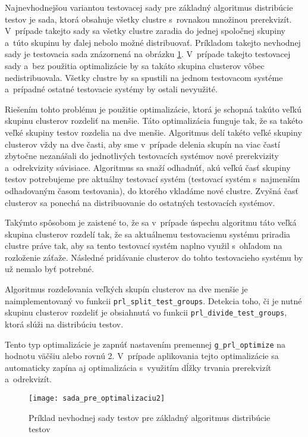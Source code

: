 Najnevhodnejšou variantou testovacej sady pre základný algoritmus 
distribúcie testov je sada, ktorá obsahuje všetky clustre s~rovnakou 
množinou prerekvizít. V~prípade takejto sady sa všetky clustre zaradia 
do jednej spoločnej skupiny a~túto skupinu by ďalej nebolo možné 
distribuovať. Príkladom takejto nevhodnej sady je testovacia sada 
znázornená na obrázku \ref{obrazok:sada_pre_optimalizaciu2}.
V~prípade takejto testovacej sady a~bez použitia optimalizácie by 
sa takáto skupina clusterov vôbec nedistribuovala. Všetky clustre by sa 
spustili na jednom testovacom systéme a~prípadné ostatné testovacie 
systémy by ostali nevyužité.

Riešením tohto problému je použitie optimalizácie, ktorá je schopná 
takúto veľkú skupinu clusterov rozdeliť na menšie. 
Táto optimalizácia funguje tak,
že sa takéto veľké skupiny testov rozdelia na dve menšie. 
Algoritmus delí takéto veľké skupiny clusterov vždy na dve časti, 
aby sme v~prípade delenia skupín na viac častí zbytočne nezanášali do 
jednotlivých testovacích systémov nové prerekvizity a~odrekvizity
súvisiace. Algoritmus sa snaží odhadnúť, akú veľkú časť skupiny testov 
potrebujeme pre aktuálny testovací systém 
(testovací systém s~najmenším odhadovaným časom testovania), 
do ktorého vkladáme nové clustre. Zvyšná časť clusterov sa ponechá na 
distribuovanie do ostatných testovacích systémov. 

Takýmto spôsobom je zaistené to, že sa v~prípade úspechu algoritmu táto 
veľká skupina clusterov rozdelí tak, že sa aktuálnemu testovaciemu 
systému priradia clustre práve tak, aby sa tento testovací systém 
naplno využil s~ohľadom na rozloženie záťaže. Následné pridávanie 
clusterov do tohto testovacieho systému by už nemalo byť potrebné.

Algoritmus rozdeľovania veľkých skupín clusterov na dve menšie je 
naimplementovaný vo funkcii \texttt{prl\_split\_test\_groups}.
Detekcia toho, či je nutné skupinu clusterov rozdeliť je obsiahnutá vo 
funkcii \texttt{prl\_divide\_test\_groups}, ktorá slúži na 
distribúciu testov.

Tento typ optimalizácie je zapnúť nastavením premennej 
\texttt{g\_prl\_optimize} na hodnotu väčšiu alebo rovnú 2. 
V~prípade aplikovania tejto optimalizácie sa automaticky zapína
aj optimalizácia s~využitím dĺžky trvania prerekvizít a~odrekvizít.


\begin{figure}[h]
  \begin{center}
    \texttt{[image: sada\_pre\_optimalizaciu2]}
    \caption{Príklad nevhodnej sady testov pre základný algoritmus 
             distribúcie testov}
    \label{obrazok:sada_pre_optimalizaciu2}
  \end{center}
\end{figure}



